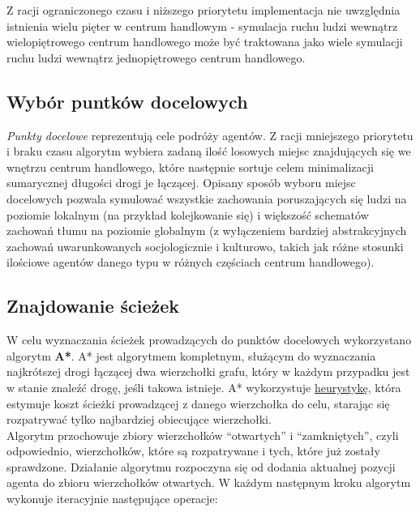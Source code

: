 \documentclass[a4paper, 12pt]{article}
\begin{document}
\noindent
Z racji ograniczonego czasu i niższego priorytetu implementacja nie uwzględnia istnienia wielu pięter w centrum handlowym - symulacja ruchu ludzi wewnątrz wielopiętrowego centrum handlowego może być traktowana jako wiele symulacji ruchu ludzi wewnątrz jednopiętrowego centrum handlowego.

        \subsection{Wybór puntków docelowych}
        \label{sec:destination-choice}

        \emph{Punkty docelowe} reprezentują cele podróży agentów. Z racji mniejszego priorytetu i braku czasu algorytm wybiera zadaną ilość losowych miejsc znajdujących się we wnętrzu centrum handlowego, które następnie sortuje celem minimalizacji sumarycznej długości drogi je łączącej. Opisany sposób wyboru miejsc docelowych pozwala symulować wszystkie zachowania poruszających się ludzi na poziomie lokalnym (na przykład kolejkowanie się) i większość schematów zachowań tłumu na poziomie globalnym (z wyłączeniem bardziej abstrakcyjnych zachowań uwarunkowanych socjologicznie i kulturowo, takich jak różne stosunki ilościowe agentów danego typu w różnych częściach centrum handlowego).

\newpage
        \subsection{Znajdowanie ścieżek}
        \label{sec:path-finding}

W celu wyznaczania ścieżek prowadzących do punktów docelowych wykorzystano algorytm \textbf{A*}. A* jest algorytmem kompletnym, służącym do wyznaczania najkrótszej drogi łączącej dwa wierzchołki grafu, który w każdym przypadku jest w stanie znaleźć drogę, jeśli takowa istnieje. A* wykorzystuje \hyperref[sec:path-deviation]{heurystykę}, która estymuje koszt ścieżki prowadzącej z danego wierzchołka do celu, starając się rozpatrywać tylko najbardziej obiecujące wierzchołki. \\

\noindent
Algorytm przochowuje zbiory wierzchołków ``otwartych'' i ``zamkniętych'', czyli odpowiednio, wierzchołków, które są rozpatrywane i tych, które już zostały sprawdzone. Działanie algorytmu rozpoczyna się od dodania aktualnej pozycji agenta do zbioru wierzchołków otwartych. W każdym następnym kroku algorytm wykonuje iteracyjnie następujące operacje:
\end{document}
